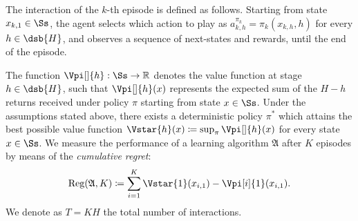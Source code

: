 The interaction of the $k$-th episode is defined as follows. Starting from state $x_{k,1} \in \Ss$, the agent selects which action to play as $a_{k,h}^{\pi_k} = \pi_k (x_{k,h}, h)$ for every $h \in \dsb{H}$, and observes a sequence of next-states and rewards, until the end of the episode.

The function $\Vpi[]{h} : \Ss \to \mathbb{R}$ denotes the value function at stage $h \in \dsb{H}$, such that $\Vpi[]{h}(x)$ represents the expected sum of the $H-h$ returns received under policy $\pi$ starting from state $x\in\Ss$. Under the assumptions stated above, there exists a deterministic policy $\pi^*$ which attains the best possible value function $\Vstar{h}(x) \coloneqq \sup_{\pi} \Vpi[]{h}(x)$ for every state $x \in \Ss$.
We measure the performance of a learning algorithm $\mathfrak{A}$ after $K$ episodes by means of the \emph{cumulative regret}:
\begin{equation*}
    \textnormal{Reg}(\mathfrak{A}, K) \coloneqq \sum_{i=1}^K \Vstar{1}(x_{i,1}) - \Vpi[i]{1}(x_{i,1}).
\end{equation*}
We denote as $T=KH$ the total number of interactions.